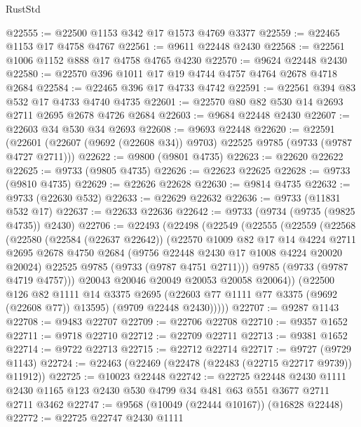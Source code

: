 \begin{lexlean}{RustStd}
\begin{coremodule}
@22555 := @22500 @1153 @342 @17 @1573 @4769 @3377
@22559 := @22465 @1153 @17 @4758 @4767
@22561 := @9611 @22448 @2430
@22568 := @22561 @1006 @1152 @888 @17 @4758 @4765 @4230
@22570 := @9624 @22448 @2430
@22580 := @22570 @396 @1011 @17 @19 @4744 @4757 @4764 @2678 @4718 @2684
@22584 := @22465 @396 @17 @4733 @4742
@22591 := @22561 @394 @83 @532 @17 @4733 @4740 @4735
@22601 := @22570 @80 @82 @530 @14 @2693 @2711 @2695 @2678 @4726 @2684
@22603 := @9684 @22448 @2430
@22607 := @22603 @34 @530 @34 @2693
@22608 := @9693 @22448
@22620 := @22591
    (@22601 (@22607 (@9692 (@22608 @34)) @9703) @22525 @9785 (@9733 (@9787 @4727 @2711)))
@22622 := @9800 (@9801 @4735)
@22623 := @22620 @22622
@22625 := @9733 (@9805 @4735)
@22626 := @22623 @22625
@22628 := @9733 (@9810 @4735)
@22629 := @22626 @22628
@22630 := @9814 @4735
@22632 := @9733 (@22630 @532)
@22633 := @22629 @22632
@22636 := @9733 (@11831 @532 @17)
@22637 := @22633 @22636
@22642 := @9733 (@9734 (@9735 (@9825 @4735)) @2430)
@22706 := @22493
    (@22498
      (@22549
        (@22555
          (@22559
            (@22568
              (@22580
                (@22584 (@22637 @22642))
                (@22570
                  @1009
                  @82
                  @17
                  @14
                  @4224
                  @2711
                  @2695
                  @2678
                  @4750
                  @2684
                  (@9756 @22448 @2430 @17 @1008 @4224 @20020 @20024)
                  @22525
                  @9785
                  (@9733 (@9787 @4751 @2711)))
                @9785
                (@9733 (@9787 @4719 @4757)))
              @20043
              @20046
              @20049
              @20053
              @20058
              @20064))
          (@22500
            @126
            @82
            @1111
            @14
            @3375
            @2695
            (@22603 @77 @1111 @77 @3375 (@9692 (@22608 @77)) @13595)
            (@9709 @22448 @2430)))))
@22707 := @9287 @1143
@22708 := @9483 @22707
@22709 := @22706 @22708
@22710 := @9357 @1652
@22711 := @9718 @22710
@22712 := @22709 @22711
@22713 := @9381 @1652
@22714 := @9722 @22713
@22715 := @22712 @22714
@22717 := @9727 (@9729 @1143)
@22724 := @22463 (@22469 (@22478 (@22483 (@22715 @22717 @9739)) @11912))
@22725 := @10023 @22448
@22742 := @22725
    @22448
    @2430
    @1111
    @2430
    @1165
    @123
    @2430
    @530
    @4799
    @34
    @481
    @63
    @551
    @3677
    @2711
    @2711
    @3462
@22747 := @9568 (@10049 (@22444 @10167)) (@16828 @22448)
@22772 := @22725
    @22747
    @2430
    @1111

\end{coremodule}
\end{lexlean}
